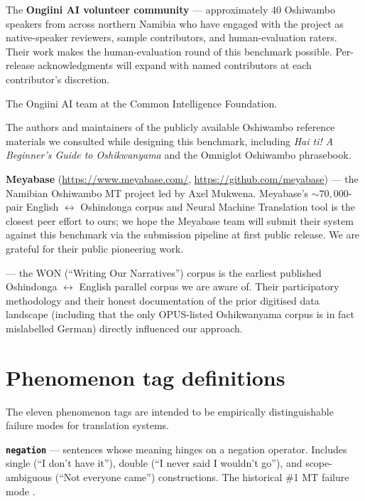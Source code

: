 \documentclass[11pt]{article}
\begin{document}
The \textbf{Ongiini AI volunteer community} --- approximately 40
Oshiwambo speakers from across northern Namibia who have engaged
with the project as native-speaker reviewers, sample contributors,
and human-evaluation raters. Their work makes the human-evaluation
round of this benchmark possible. Per-release acknowledgments will
expand with named contributors at each contributor's discretion.

The Ongiini AI team at the Common Intelligence Foundation.

The authors and maintainers of the publicly available Oshiwambo
reference materials we consulted while designing this benchmark,
including \emph{Hai ti! A Beginner's Guide to Oshikwanyama}
\citep{crane2004haiti} and the Omniglot Oshiwambo phrasebook.

\textbf{Meyabase} (\url{https://www.meyabase.com/},
\url{https://github.com/meyabase}) --- the Namibian Oshiwambo MT
project led by Axel Mukwena. Meyabase's $\sim 70{,}000$-pair
English $\leftrightarrow$ Oshindonga corpus and Neural Machine
Translation tool is the closest peer effort to ours; we hope the
Meyabase team will submit their system against this benchmark via
the submission pipeline at first public release. We are grateful
for their public pioneering work.

\citet{nekoto2022won} --- the WON (``Writing Our Narratives'')
corpus is the earliest published Oshindonga $\leftrightarrow$
English parallel corpus we are aware of. Their participatory
methodology and their honest documentation of the prior digitised
data landscape (including that the only OPUS-listed Oshikwanyama
corpus is in fact mislabelled German) directly influenced our
approach.



\appendix

\section{Phenomenon tag definitions}
\label{appendix:phenomena}

The eleven phenomenon tags are intended to be empirically
distinguishable failure modes for translation systems.

\textbf{\texttt{negation}} --- sentences whose meaning hinges on a
negation operator. Includes single (``I don't have it''), double
(``I never said I wouldn't go''), and scope-ambiguous (``Not
everyone came'') constructions. The historical \#1 MT failure mode
\citep{hossain2020negation}.
\end{document}
